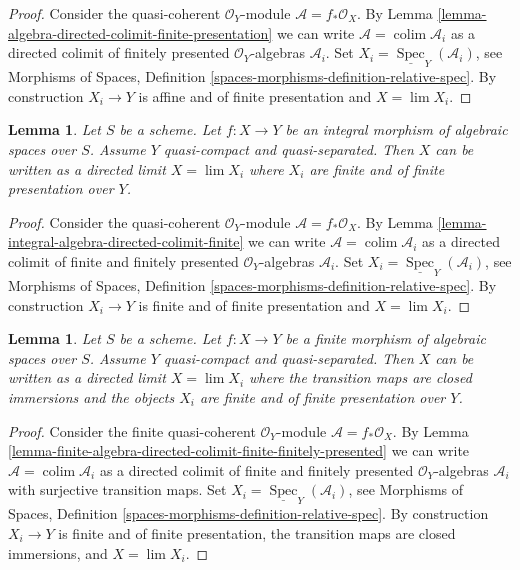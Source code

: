 \documentclass{stacks-project}
\theoremstyle{plain}
\newtheorem{lemma}[subsection]{Lemma}
\theoremstyle{definition}
\theoremstyle{remark}
\numberwithin{equation}{subsection}
\def\lim{\mathop{\mathrm{lim}}\nolimits}
\def\colim{\mathop{\mathrm{colim}}\nolimits}
\def\Spec{\mathop{\mathrm{Spec}}}
\begin{document}
\begin{proof}
Consider the quasi-coherent $\mathcal{O}_Y$-module
$\mathcal{A} = f_*\mathcal{O}_X$. By
Lemma \ref{lemma-algebra-directed-colimit-finite-presentation}
we can write $\mathcal{A} = \colim \mathcal{A}_i$ as a directed
colimit of finitely presented
$\mathcal{O}_Y$-algebras $\mathcal{A}_i$.
Set $X_i = \underline{\Spec}_Y(\mathcal{A}_i)$, see
Morphisms of Spaces, Definition
\ref{spaces-morphisms-definition-relative-spec}.
By construction $X_i \to Y$ is affine and of finite presentation
and $X = \lim X_i$.
\end{proof}

\begin{lemma}
\label{lemma-integral-limit-finite-and-finite-presentation}
Let $S$ be a scheme. Let $f : X \to Y$ be an integral morphism of algebraic
spaces over $S$. Assume $Y$ quasi-compact and quasi-separated.
Then $X$ can be written as a directed limit $X = \lim X_i$
where $X_i$ are finite and of finite presentation over $Y$.
\end{lemma}

\begin{proof}
Consider the quasi-coherent $\mathcal{O}_Y$-module
$\mathcal{A} = f_*\mathcal{O}_X$. By
Lemma \ref{lemma-integral-algebra-directed-colimit-finite}
we can write $\mathcal{A} = \colim \mathcal{A}_i$ as a directed
colimit of finite and finitely presented $\mathcal{O}_Y$-algebras
$\mathcal{A}_i$.
Set $X_i = \underline{\Spec}_Y(\mathcal{A}_i)$, see
Morphisms of Spaces, Definition
\ref{spaces-morphisms-definition-relative-spec}.
By construction $X_i \to Y$ is finite and of finite presentation and
$X = \lim X_i$.
\end{proof}

\begin{lemma}
\label{lemma-finite-in-finite-and-finite-presentation}
Let $S$ be a scheme. Let $f : X \to Y$ be a finite morphism of algebraic
spaces over $S$. Assume $Y$ quasi-compact and quasi-separated.
Then $X$ can be written as a directed limit $X = \lim X_i$
where the transition maps are closed immersions and the objects
$X_i$ are finite and of finite presentation over $Y$.
\end{lemma}

\begin{proof}
Consider the finite quasi-coherent $\mathcal{O}_Y$-module
$\mathcal{A} = f_*\mathcal{O}_X$. By
Lemma \ref{lemma-finite-algebra-directed-colimit-finite-finitely-presented}
we can write $\mathcal{A} = \colim \mathcal{A}_i$ as a directed
colimit of finite and finitely presented $\mathcal{O}_Y$-algebras
$\mathcal{A}_i$ with surjective transition maps.
Set $X_i = \underline{\Spec}_Y(\mathcal{A}_i)$, see
Morphisms of Spaces, Definition
\ref{spaces-morphisms-definition-relative-spec}.
By construction $X_i \to Y$ is finite and of finite presentation,
the transition maps are closed immersions, and $X = \lim X_i$.
\end{proof}
\end{document}
